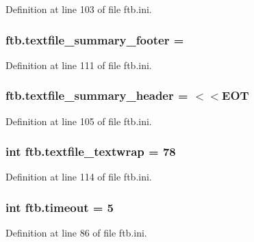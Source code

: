 Definition at line 103 of file ftb.\-ini.

\hypertarget{namespaceftb_af90084a3047b905a789299e4621983f4}{
\subsubsection[{textfile\-\_\-summary\-\_\-footer}]{\setlength{\rightskip}{0pt plus 5cm}ftb.\-textfile\-\_\-summary\-\_\-footer =}}\label{namespaceftb_af90084a3047b905a789299e4621983f4}


Definition at line 111 of file ftb.\-ini.

\hypertarget{namespaceftb_a7d7d4c6685484abf921270e3427670e8}{
\subsubsection[{textfile\-\_\-summary\-\_\-header}]{\setlength{\rightskip}{0pt plus 5cm}ftb.\-textfile\-\_\-summary\-\_\-header = $<$$<$E\-O\-T}}\label{namespaceftb_a7d7d4c6685484abf921270e3427670e8}


Definition at line 105 of file ftb.\-ini.

\hypertarget{namespaceftb_a5be38c1bd9675f6ab63cbe757193526d}{
\subsubsection[{textfile\-\_\-textwrap}]{\setlength{\rightskip}{0pt plus 5cm}int ftb.\-textfile\-\_\-textwrap = 78}}\label{namespaceftb_a5be38c1bd9675f6ab63cbe757193526d}


Definition at line 114 of file ftb.\-ini.

\hypertarget{namespaceftb_af4129b964c3298abd3b378dc8c5f5321}{
\subsubsection[{timeout}]{\setlength{\rightskip}{0pt plus 5cm}int ftb.\-timeout = 5}}\label{namespaceftb_af4129b964c3298abd3b378dc8c5f5321}


Definition at line 86 of file ftb.\-ini.

